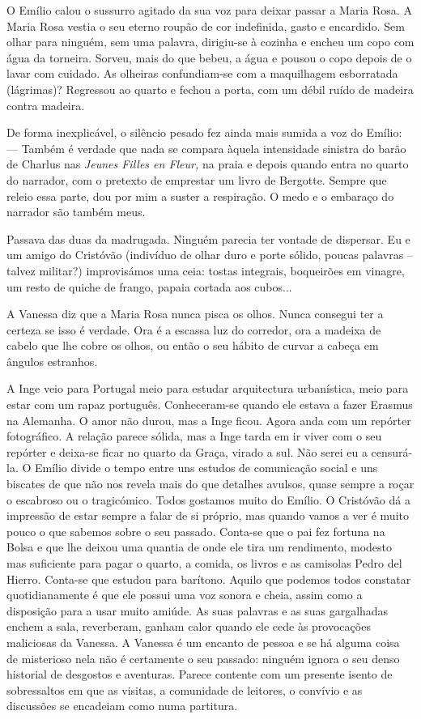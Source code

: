 O Emílio calou o sussurro agitado da sua voz para deixar passar a Maria
Rosa. A Maria Rosa vestia o seu eterno roupão de cor indefinida, gasto e
encardido. Sem olhar para ninguém, sem uma palavra, dirigiu-se à cozinha
e encheu um copo com água da torneira. Sorveu, mais do que bebeu, a água
e pousou o copo depois de o lavar com cuidado. As olheiras confundiam-se com a maquilhagem esborratada (lágrimas)? Regressou ao quarto e
fechou a porta, com um débil ruído de madeira contra madeira.

De forma inexplicável, o silêncio pesado fez ainda mais sumida a voz do
Emílio: --- Também é verdade que nada se compara àquela intensidade
sinistra do barão de Charlus nas \emph{Jeunes Filles en Fleur, }na praia
e depois quando entra no quarto do narrador, com o pretexto de emprestar
um livro de
Bergotte. Sempre que releio essa parte, dou por mim a suster a
respiração. O medo e o embaraço do narrador são também meus.

Passava das duas da madrugada. Ninguém parecia ter vontade de dispersar.
Eu e um amigo do Cristóvão (indivíduo de olhar duro e porte sólido,
poucas palavras -- talvez militar?) improvisámos uma ceia: tostas
integrais, boqueirões em vinagre, um resto de quiche de frango, papaia
cortada aos cubos...

A Vanessa diz que a Maria Rosa nunca pisca os olhos. Nunca consegui ter
a certeza se isso é verdade. Ora é a escassa luz do corredor, ora a
madeixa de cabelo que lhe cobre os olhos, ou então o seu hábito de
curvar a cabeça em ângulos estranhos.

\medskip
\asterisc
\medskip


A Inge veio para Portugal meio para estudar arquitectura urbanística,
meio para estar com um rapaz português. Conheceram-se quando ele
estava a fazer Erasmus na Alemanha. O amor não durou, mas a Inge ficou.
Agora anda com um repórter fotográfico. A relação parece sólida, mas a
Inge tarda em ir viver com o seu repórter e deixa-se ficar no quarto da
Graça, virado a sul. Não serei eu a censurá-la. O Emílio divide o tempo
entre uns estudos de comunicação social e uns biscates de que não nos
revela mais do que detalhes avulsos, quase sempre a roçar o escabroso ou
o tragicómico. Todos gostamos muito do Emílio. O Cristóvão dá a
impressão de estar sempre a falar de si próprio, mas quando vamos a ver
é muito pouco o que sabemos sobre o seu passado. Conta-se que o pai fez fortuna
na Bolsa e que lhe deixou uma quantia de onde ele tira um rendimento,
modesto mas suficiente para pagar o quarto, a comida, os livros e as
camisolas Pedro del Hierro. Conta-se que estudou para barítono. Aquilo
que podemos todos constatar quotidianamente é que ele possui uma voz
sonora e cheia, assim como a disposição para a usar muito amiúde. As
suas palavras e as suas gargalhadas enchem a sala, reverberam, ganham
calor quando ele cede às provocações maliciosas da Vanessa. A Vanessa é
um encanto de pessoa e se há alguma coisa de misterioso nela não é
certamente o seu passado: ninguém ignora o seu denso historial de
desgostos e aventuras. Parece contente com um presente isento de sobressaltos em que as visitas, a comunidade de leitores, o convívio e as
discussões se encadeiam como numa partitura.

